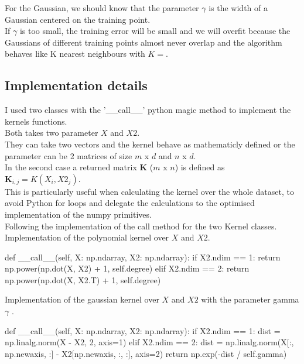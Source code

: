 For the Gaussian, we should know that the parameter $\gamma$ is the width of a Gaussian centered on the training point.\\
If $\gamma$ is too small, the training error will be small and we will overfit because the Gaussians of different training points almost never overlap and the algorithm behaves like K nearest neighbours with $K =$.\\


\subsection{Implementation details}
I used two classes with the '\_\_call\_\_' python magic method to implement the kernels functions.\\
Both takes two parameter $X$ and $X2$.\\
They can take two vectors and the kernel behave as mathematicly defined or the parameter can be 2 matrices of size $m$ x $d$ and $n$ x $d$.\\
In the second case a returned matrix $\boldsymbol{K}$ ($m$ x $n$) is defined as $\boldsymbol{K}_{i, j} = K(X_i, X2_j)$.\\
This is particularly useful when calculating the kernel over the whole dataset, to avoid Python for loops and delegate the calculations to the optimised implementation of the numpy primitives.\\

Following the implementation of the call method for the two Kernel classes.\\
Implementation of the polynomial kernel over $X$ and $X2$.\\
\begin{python}
def __call__(self, X: np.ndarray, X2: np.ndarray):
    if X2.ndim == 1:
        return np.power(np.dot(X, X2) + 1, self.degree)
    elif X2.ndim == 2:
        return np.power(np.dot(X, X2.T) + 1, self.degree)
\end{python}

Implementation of the gaussian kernel over $X$ and $X2$ with the parameter gamma $\gamma$ .\\
\begin{python}
    def __call__(self, X: np.ndarray, X2: np.ndarray):
        if X2.ndim == 1:
            dist = np.linalg.norm(X - X2, 2, axis=1)
        elif X2.ndim == 2:
            dist = np.linalg.norm(X[:, np.newaxis, :] - X2[np.newaxis, :, :], axis=2)
        return np.exp(-dist / self.gamma)
\end{python}

